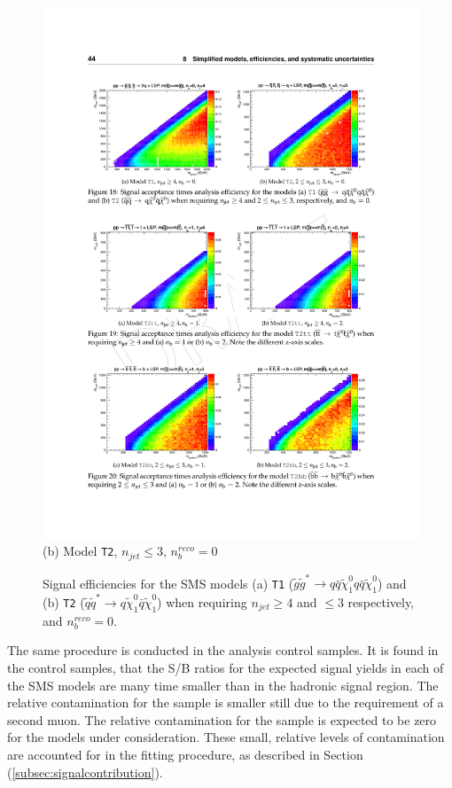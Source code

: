 \begin{figure}[ht]
\begin{minipage}[b]{0.45\linewidth}
\includegraphics[width = 1.0\linewidth]{plots/t2_signal_eff.pdf}
\centering(b)  Model \texttt{T2}, $n_{jet} \leq 3$, $n_{b}^{reco} = 0$ 
\end{minipage}
\caption[Signal efficiencies fo the \ac{SMS} models (a) \texttt{T1} and (b) \texttt{T2}.]{Signal efficiencies for the \ac{SMS} models (a) \texttt{T1} ($\widetilde{g}\widetilde{g}^{*}\rightarrow q\bar{q}\widetilde{\chi}^{0}_{1}q\bar{q}\widetilde{\chi}^{0}_{1}$) and (b) \texttt{T2} ($ \widetilde{q}\widetilde{q}^{*} \rightarrow q\widetilde{\chi}^{0}_{1}\bar{q}\widetilde{\chi}^{0}_{1}$) when requiring $n_{jet} \geq 4$ and $\leq 3$ respectively, and $n_{b}^{reco} = 0$.}
\label{fig:smsefficiencyplots}
\end{figure}


The same procedure is conducted in the analysis control samples. It is found in the \mupjets control samples, that the S/B ratios for the expected signal yields in each of the \ac{SMS} models are many time smaller than in the hadronic signal region. The relative contamination for the \dimupjets sample is smaller still due to the requirement of a second muon. The relative contamination for the \gpjets sample is expected to be zero for the models under consideration. These small, relative levels of contamination are accounted for in the fitting procedure, as described in Section (\ref{subsec:signalcontribution}).


